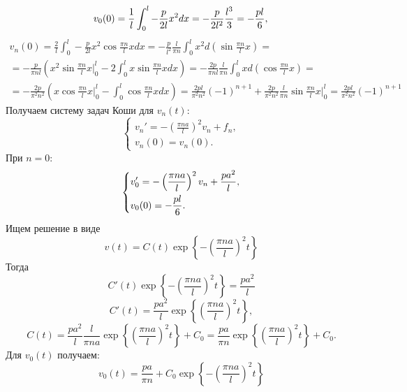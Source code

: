 \documentclass[11pt]{article}
\begin{document}
\begin{equation*}
v_0(0) = \frac1l\int_0^l-\frac{p}{2l}x^2dx = -\frac{p}{2l^2}\frac{l^3}3 = -\frac{pl}6, \\
\end{equation*}
\begin{multline*}
v_n(0) = \frac2l\int_0^l-\frac{p}{2l}x^2\cos\frac{\pi n}lxdx =
-\frac{p}{l^2}\frac{l}{\pi n}\int_0^lx^2d\left(\sin\frac{\pi n}lx\right) = \\
= -\frac{p}{\pi nl}\left(x^2\sin\frac{\pi n}lx\bigg|_0^l - 2\int_0^lx\sin\frac{\pi n}lxdx\right) =
-\frac{2p}{\pi nl}\frac{l}{\pi n}\int_0^lxd\left(\cos\frac{\pi n}lx\right) = \\
= -\frac{2p}{\pi^2n^2}\left(x\cos\frac{\pi n}lx\bigg|_0^l - \int_0^l\cos\frac{\pi n}lxdx\right) =
\frac{2pl}{\pi^2n^2}(-1)^{n + 1} + \frac{2p}{\pi^2n^2}\frac{l}{\pi n}\sin\frac{\pi n}lx\bigg|_0^l =
\frac{2pl}{\pi^2n^2}(-1)^{n + 1}
\end{multline*}
Получаем систему задач Коши для $v_n(t)$:
\begin{equation}
\begin{cases}
v_n' = -\left(\frac{\pi na}l\right)^2v_n + f_n, \\
v_n(0) = v_n(0).
\end{cases}
\end{equation}
При $n = 0$:
\begin{equation*}
\begin{dcases}
v_0' = -\left(\frac{\pi na}l\right)^2v_n + \frac{pa^2}l, \\
v_0(0) = -\frac{pl}6.
\end{dcases}
\end{equation*}
Ищем решение в виде
\begin{equation*}
v(t) = C(t)\exp\left\{-\left(\frac{\pi na}l\right)^2t\right\}
\end{equation*}
Тогда
\begin{equation*}
C'(t)\exp\left\{-\left(\frac{\pi na}l\right)^2t\right\} = \frac{pa^2}l
\end{equation*}
\begin{equation*}
C'(t) = \frac{pa^2}l\exp\left\{\left(\frac{\pi na}l\right)^2t\right\},
\end{equation*}
\begin{equation*}
C(t) = \frac{pa^2}l\frac{l}{\pi na}\exp\left\{\left(\frac{\pi na}l\right)^2t\right\} + C_0 =
\frac{pa}{\pi n}\exp\left\{\left(\frac{\pi na}l\right)^2t\right\} + C_0.
\end{equation*}
Для $v_0(t)$ получаем:
\begin{equation*}
v_0(t) = \frac{pa}{\pi n} + C_0\exp\left\{-\left(\frac{\pi na}l\right)^2t\right\}
\end{equation*}
\end{document}
